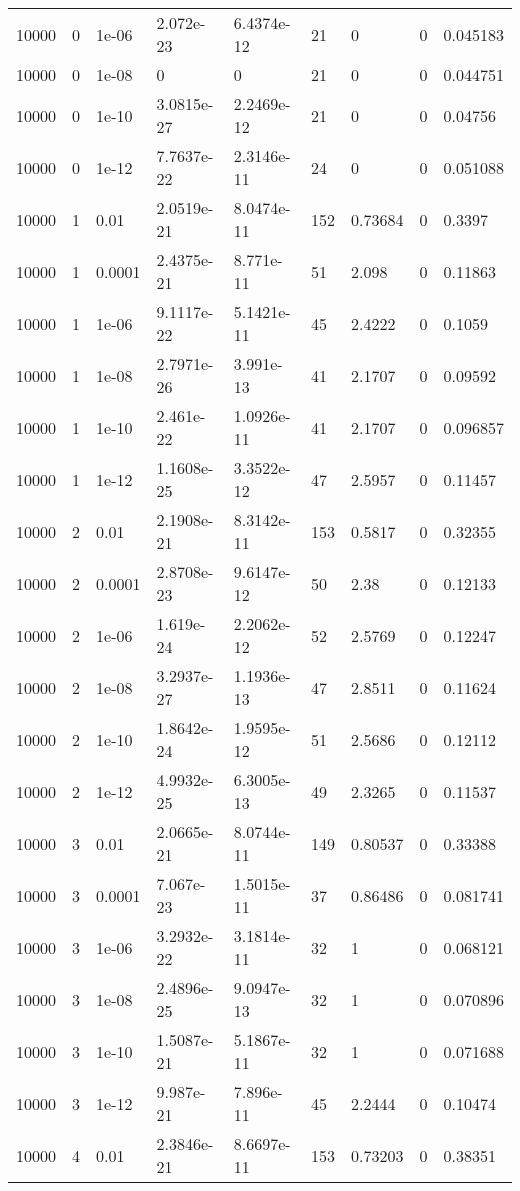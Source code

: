 \begin{tabular}{lllllllll}
10000 & 0 & 1e-06 & 2.072e-23 & 6.4374e-12 & 21 & 0 & 0 & 0.045183 \\ 
10000 & 0 & 1e-08 & 0 & 0 & 21 & 0 & 0 & 0.044751 \\ 
10000 & 0 & 1e-10 & 3.0815e-27 & 2.2469e-12 & 21 & 0 & 0 & 0.04756 \\ 
10000 & 0 & 1e-12 & 7.7637e-22 & 2.3146e-11 & 24 & 0 & 0 & 0.051088 \\ 
10000 & 1 & 0.01 & 2.0519e-21 & 8.0474e-11 & 152 & 0.73684 & 0 & 0.3397 \\ 
10000 & 1 & 0.0001 & 2.4375e-21 & 8.771e-11 & 51 & 2.098 & 0 & 0.11863 \\ 
10000 & 1 & 1e-06 & 9.1117e-22 & 5.1421e-11 & 45 & 2.4222 & 0 & 0.1059 \\ 
10000 & 1 & 1e-08 & 2.7971e-26 & 3.991e-13 & 41 & 2.1707 & 0 & 0.09592 \\ 
10000 & 1 & 1e-10 & 2.461e-22 & 1.0926e-11 & 41 & 2.1707 & 0 & 0.096857 \\ 
10000 & 1 & 1e-12 & 1.1608e-25 & 3.3522e-12 & 47 & 2.5957 & 0 & 0.11457 \\ 
10000 & 2 & 0.01 & 2.1908e-21 & 8.3142e-11 & 153 & 0.5817 & 0 & 0.32355 \\ 
10000 & 2 & 0.0001 & 2.8708e-23 & 9.6147e-12 & 50 & 2.38 & 0 & 0.12133 \\ 
10000 & 2 & 1e-06 & 1.619e-24 & 2.2062e-12 & 52 & 2.5769 & 0 & 0.12247 \\ 
10000 & 2 & 1e-08 & 3.2937e-27 & 1.1936e-13 & 47 & 2.8511 & 0 & 0.11624 \\ 
10000 & 2 & 1e-10 & 1.8642e-24 & 1.9595e-12 & 51 & 2.5686 & 0 & 0.12112 \\ 
10000 & 2 & 1e-12 & 4.9932e-25 & 6.3005e-13 & 49 & 2.3265 & 0 & 0.11537 \\ 
10000 & 3 & 0.01 & 2.0665e-21 & 8.0744e-11 & 149 & 0.80537 & 0 & 0.33388 \\ 
10000 & 3 & 0.0001 & 7.067e-23 & 1.5015e-11 & 37 & 0.86486 & 0 & 0.081741 \\ 
10000 & 3 & 1e-06 & 3.2932e-22 & 3.1814e-11 & 32 & 1 & 0 & 0.068121 \\ 
10000 & 3 & 1e-08 & 2.4896e-25 & 9.0947e-13 & 32 & 1 & 0 & 0.070896 \\ 
10000 & 3 & 1e-10 & 1.5087e-21 & 5.1867e-11 & 32 & 1 & 0 & 0.071688 \\ 
10000 & 3 & 1e-12 & 9.987e-21 & 7.896e-11 & 45 & 2.2444 & 0 & 0.10474 \\ 
10000 & 4 & 0.01 & 2.3846e-21 & 8.6697e-11 & 153 & 0.73203 & 0 & 0.38351 \\ 

\end{tabular}
